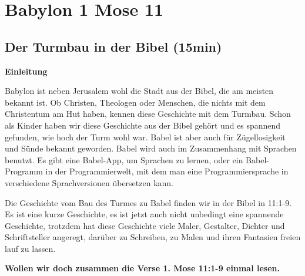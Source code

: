 \documentclass[14pt]{../../inc/mybib}
\author{Lothar Schmid}
\newenvironment{block}[1][]{%
  \vspace{1.5em}%
  \noindent\textbf{#1}\par%
  \vspace{0.0em}%
}{%
  \vspace{1em}%
}
\begin{document}
\setlength{\baselineskip}{1.5\baselineskip}
\section{Babylon 1 Mose 11}

\subsection{Der Turmbau in der Bibel (15min)}
    \begin{block}[Einleitung]
    Babylon ist neben Jerusalem wohl die Stadt aus der Bibel, die am meisten bekannt ist. Ob Christen, Theologen oder Menschen, die nichts mit dem Christentum am Hut haben, kennen diese Geschichte mit dem Turmbau. Schon als Kinder haben wir diese Geschichte aus der Bibel gehört und es spannend gefunden, wie hoch der Turm wohl war. Babel ist aber auch für Zügellosigkeit und Sünde bekannt geworden. Babel wird auch im Zusammenhang mit Sprachen benutzt. Es gibt eine Babel-App, um Sprachen zu lernen, oder ein Babel-Programm in der Programmierwelt, mit dem man eine Programmiersprache in verschiedene Sprachversionen übersetzen kann.
    \end{block}
    \begin{block}
    Die Geschichte vom Bau des Turmes zu Babel finden wir in der Bibel in  {11:1-9}. Es ist eine kurze Geschichte, es ist jetzt auch nicht unbedingt eine spannende Geschichte, trotzdem hat diese Geschichte viele Maler, Gestalter, Dichter und Schriftsteller angeregt, darüber zu Schreiben, zu Malen und ihren Fantasien freien lauf zu lassen. 
    \end{block}

    \textbf{Wollen wir doch zusammen die Verse 1. Mose 11:1-9 einmal lesen.}
    
\end{document}
